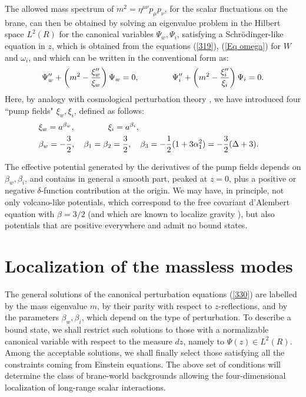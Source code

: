 \documentclass[a4paper,12pt]{article}
\begin{document}
The allowed mass spectrum of $m^2=\eta^{\mu\nu} p_\mu p_\nu$, for
the scalar fluctuations on the brane, can then be obtained by
solving an eigenvalue problem in the Hilbert space $L^2(R)$ for
the canonical variables $\Psi_w,\Psi_i$, satisfying a
Schr\"odinger-like equation in $z$, which is obtained from the
equations (\ref{319}), (\ref{Eq omega})  for $W$ and $\omega_i$,
and which can be written in the conventional form as:
\begin{equation}
\Psi_w''+\left(m^2- {\xi_w''\over \xi_w}\right)\Psi_w=0,
~~~~~~~~~~~~ \Psi_i''+\left(m^2- {\xi_i''\over
\xi_i}\right)\Psi_i=0. \label{330}
\end{equation}
Here, by analogy with cosmological perturbation theory \cite{MBF},
we have introduced four ``pump fields" $\xi_w,\xi_i$, defined  as
follows:\begin{eqnarray} & \xi_w=a^{\beta_w}, ~~~~~~~~~~~~
\xi_i=a^{\beta_i},& \nonumber\\ & \beta_w=-{3\over 2},~~~
\beta_1=\beta_2 ={3\over 2}, ~~~ \beta_3=-{1\over 2}(1+3
\alpha_1^2)=-{3\over 2}(\Delta+3). &\label{332} \end{eqnarray}

The effective potential generated by the derivatives of the pump
fields depends on $\beta_w,\beta_i$, and contains in general a
smooth part, peaked at $z=0$, plus a positive or negative
$\delta$-function contribution at the origin. We may have, in
principle, not only volcano-like potentials, which correspond to
the free covariant d'Alembert equation with $\beta=3/2$ \cite{CLP}
(and which are known to localize gravity \cite{RS2,CEHS}), but
also potentials that are positive everywhere and admit no bound
states.

\section{Localization of the massless modes}

The general solutions of the canonical perturbation equations
(\ref{330}) are labelled by the mass eigenvalue $m$, by their
parity with respect to $z$-reflections, and by the parameters
$\beta_w,\beta_i$, which depend on the type of perturbation. To
describe a bound state, we shall restrict such solutions to those
with a normalizable canonical variable with respect to the measure
$dz$, namely to $\Psi(z) \in L^2(R)$. Among the acceptable
solutions, we shall finally select those satisfying all the
constraints coming from Einstein equations. The above set of
conditions will determine the class of brane-world backgrounds
allowing the four-dimensional localization of long-range scalar
interactions.
\end{document}
